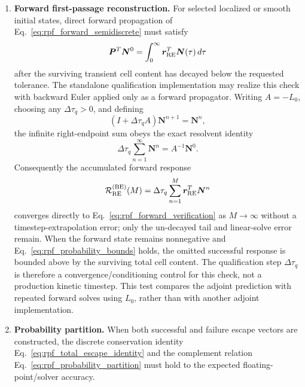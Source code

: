 \documentclass[11pt]{article}
\begin{document}
\begin{enumerate}
 \item \textbf{Forward first-passage reconstruction.}
       For selected localized or smooth initial states, direct forward propagation of
       Eq.~\eqref{eq:rpf_forward_semidiscrete} must satisfy
       \begin{equation}
        \bm P^T\bm N^0
        =\int_0^\infty\bm r_{\rm RE}^T\bm N(\tau)\,d\tau
        \label{eq:rpf_forward_verification}
       \end{equation}
       after the surviving transient cell content has decayed below the requested
       tolerance.  The standalone qualification implementation may realize this check
       with backward Euler applied only as a forward propagator.  Writing
       $A=-L_0$, choosing any $\Delta\tau_q>0$, and defining
       \begin{equation}
        (I+\Delta\tau_q A)\bm N^{n+1}=\bm N^n,
        \label{eq:rpf_forward_be_qualification}
       \end{equation}
       the infinite right-endpoint sum obeys the exact resolvent identity
       \begin{equation}
        \boxed{
        \Delta\tau_q\sum_{n=1}^{\infty}\bm N^n
        =A^{-1}\bm N^0.
        }
        \label{eq:rpf_forward_be_sum_identity}
       \end{equation}
       Consequently the accumulated forward response
       \begin{equation}
        \mathcal R_{\rm RE}^{({\rm BE})}(M)
        =\Delta\tau_q\sum_{n=1}^{M}\bm r_{\rm RE}^T\bm N^n
        \label{eq:rpf_forward_be_accumulated_response}
       \end{equation}
       converges directly to Eq.~\eqref{eq:rpf_forward_verification} as $M\to\infty$
       without a timestep-extrapolation error; only the un-decayed tail and linear-solve
       error remain.  When the forward state
       remains nonnegative and Eq.~\eqref{eq:rpf_probability_bounds} holds, the omitted
       successful response is bounded above by the surviving total cell content.
       The qualification step $\Delta\tau_q$ is therefore a convergence/conditioning
       control for this check, not a production kinetic timestep.  This test compares
       the adjoint prediction with repeated forward solves using $L_0$, rather than with
       another adjoint implementation.

 \item \textbf{Probability partition.}
       When both successful and failure escape vectors are constructed, the discrete
       conservation identity Eq.~\eqref{eq:rpf_total_escape_identity} and the complement
       relation Eq.~\eqref{eq:rpf_probability_partition} must hold to the expected
       floating-point/solver accuracy.


\end{enumerate}
\end{document}
